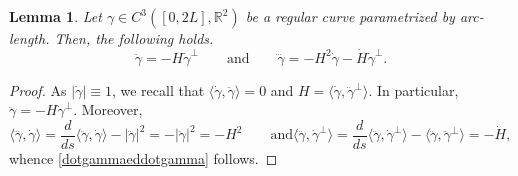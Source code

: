 \documentclass[11pt]{amsart}
\newcommand{\rr}{{\mathbb{R}}}
\newtheorem{lemma}[theorem]{Lemma}
\theoremstyle{definition}
\theoremstyle{remark}
\numberwithin{equation}{section}
\begin{document}
	\begin{lemma}\label{lemmaconcontisugammadddot}
		Let $\gamma\in C^3([0,2L],\rr^2)$ be a regular curve parametrized by arc-length. Then, the following holds.
		\begin{equation}\label{dotgammaeddotgamma}
			\ddot \gamma=-H\dot\gamma^\perp\qquad\text{and}\qquad\dddot\gamma=-H^2\dot\gamma-\dot H\dot\gamma^\perp.
		\end{equation}
	\end{lemma}
	\begin{proof}
		As $|\dot\gamma|\equiv 1$, we recall that $\big\langle\dot\gamma,\ddot\gamma\big\rangle=0$ and $H=\big\langle\dot\gamma,\ddot\gamma^\perp\big\rangle$. In particular, $\ddot\gamma=-H\dot\gamma^\perp$. Moreover,
		\begin{equation*}
			\big\langle\dddot\gamma,\dot\gamma\big\rangle=\frac{d}{ds}\big\langle\ddot\gamma,\dot\gamma\big\rangle-|\ddot\gamma|^2=-|\ddot\gamma|^2=-H^2\qquad\text{and}\big\langle\dddot\gamma,\dot\gamma^\perp\big\rangle=\frac{d}{ds}\big\langle\ddot\gamma,\dot\gamma^\perp\big\rangle-\big\langle\ddot\gamma,\ddot\gamma^\perp\big\rangle=-\dot H,
		\end{equation*}
		whence \eqref{dotgammaeddotgamma} follows. 
	\end{proof}
\end{document}
